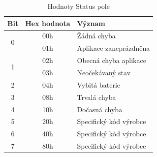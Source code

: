 				\begin{table}[!ht]
				\centering
				\vspace{-10pt}
				\caption{Hodnoty Status pole}
				\label{def_status}
				\begin{tabular}{|c|c|l|}
				\hline
				\textbf{Bit}       & \textbf{Hex hodnota} & \textbf{Význam}        \\ \hline \hline
				\multirow{2}{*}{0} & 00h                  & Žádná chyba            \\ \cline{2-3} 
													 & 01h                  & Aplikace zaneprázdněna \\ \hline
				\multirow{2}{*}{1} & 02h                  & Obecná chyba aplikace  \\ \cline{2-3} 
													 & 03h                  & Neočekávaný stav       \\ \hline
				2                  & 04h                  & Vybitá baterie         \\ \hline
				3                  & 08h                  & Trvalá chyba           \\ \hline
				4                  & 10h                  & Dočasná chyba          \\ \hline
				5                  & 20h                  & Specifický kód výrobce \\ \hline
				6                  & 40h                  & Specifický kód výrobce \\ \hline
				7                  & 80h                  & Specifický kód výrobce \\ \hline \hline
				\end{tabular}
				\end{table}


